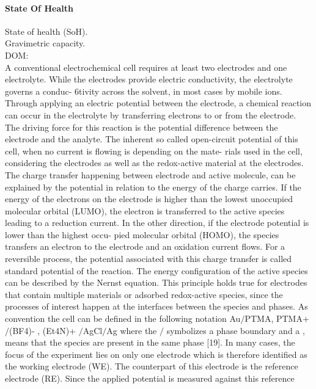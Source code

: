\paragraph{State Of Health}

State of health (SoH).\\
Gravimetric capacity.\\


DOM:\\
A conventional electrochemical cell requires at least two electrodes and one electrolyte.
While the electrodes provide electric conductivity, the electrolyte governs a conduc-
6tivity across the solvent, in most cases by mobile ions. Through applying an electric
potential between the electrode, a chemical reaction can occur in the electrolyte by
transferring electrons to or from the electrode. The driving force for this reaction is
the potential difference between the electrode and the analyte. The inherent so called
open-circuit potential of this cell, when no current is flowing is depending on the mate-
rials used in the cell, considering the electrodes as well as the redox-active material at
the electrodes. The charge transfer happening between electrode and active molecule,
can be explained by the potential in relation to the energy of the charge carries. If the
energy of the electrons on the electrode is higher than the lowest unoccupied molecular
orbital (LUMO), the electron is transferred to the active species leading to a reduction
current. In the other direction, if the electrode potential is lower than the highest occu-
pied molecular orbital (HOMO), the species transfers an electron to the electrode and
an oxidation current flows. For a reversible process, the potential associated with this
charge transfer is called standard potential of the reaction. The energy configuration
of the active species can be described by the Nernst equation.
This principle holds true for electrodes that contain multiple materials or adsorbed
redox-active species, since the processes of interest happen at the interfaces between
the species and phases. As convention the cell can be defined in the following notation
Au$/$PTMA, PTMA+ $/$(BF4)- , (Et4N)+ $/$AgCl$/$Ag
where the $/$ symbolizes a phase boundary and a , means that the species are present
in the same phase [19].
In many cases, the focus of the experiment lies on only one electrode which is therefore
identified as the working electrode (WE). The counterpart of this electrode is the
reference electrode (RE). Since the applied potential is measured against this reference
